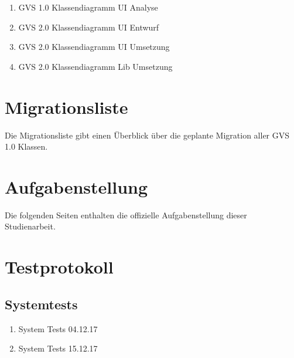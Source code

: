 \documentclass[11pt,a4paper,english,oneside]{book}
\numberwithin{equation}{chapter}
\begin{document}
	\begin{enumerate}
		\item GVS 1.0 Klassendiagramm UI Analyse
		\item GVS 2.0 Klassendiagramm UI Entwurf
		\item GVS 2.0 Klassendiagramm UI Umsetzung
		\item GVS 2.0 Klassendiagramm Lib Umsetzung
	\end{enumerate}
	
	
	
	
	
	
	\chapter{Migrationsliste} \label{ch:migration-list}
	Die Migrationsliste gibt einen Überblick über die geplante Migration aller GVS 1.0 Klassen.
	
	
	
	\chapter{Aufgabenstellung}
	\label{aufgabenstellung}
	Die folgenden Seiten enthalten die offizielle Aufgabenstellung dieser Studienarbeit.
	
	
	
	\chapter{Testprotokoll} \label{Testprotokoll}
	\section{Systemtests}
	
	\begin{enumerate}
		\item System Tests 04.12.17
		\item System Tests 15.12.17
	\end{enumerate}

	
	
	
	\clearpage
	
	
	
\end{document}
